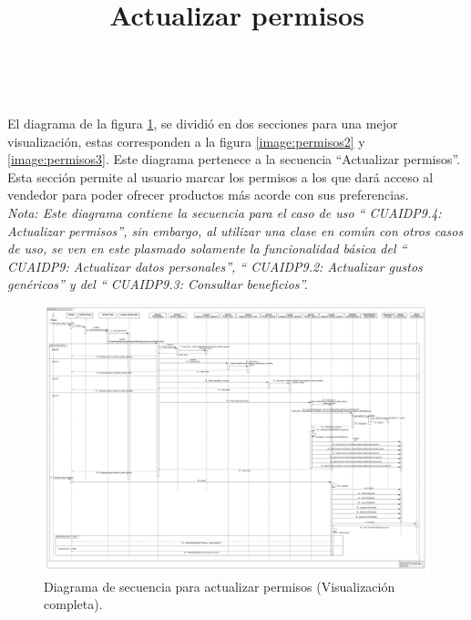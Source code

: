 \title{\textbf{Actualizar permisos}}
\\ \par
El diagrama de la figura \ref{image:permisos}, se dividió en dos secciones para una mejor visualización, estas corresponden a la figura \ref{image:permisos2} y \ref{image:permisos3}. Este diagrama pertenece a la secuencia ``Actualizar permisos''. Esta sección permite al usuario marcar los permisos a los que dará acceso al vendedor para poder ofrecer productos más acorde con sus preferencias.\\
\textit{Nota: Este diagrama contiene la secuencia para el caso de uso `` CUAIDP9.4: Actualizar permisos'', sin embargo, al utilizar una clase en común con otros casos de uso, se ven en este plasmado solamente la funcionalidad básica del `` CUAIDP9: Actualizar datos personales'',  `` CUAIDP9.2: Actualizar gustos genéricos'' y del `` CUAIDP9.3: Consultar beneficios''.}
\FloatBarrier
\begin{figure}[htbp!]
		\centering
			\includegraphics[width=1.1 \textwidth]{imagenes/Diagramas_UserApp/Nuevos_diagramas/permisos}
		\caption{Diagrama de secuencia para actualizar permisos (Visualización completa).}
		\label{image:permisos}
\end{figure}
\FloatBarrier

